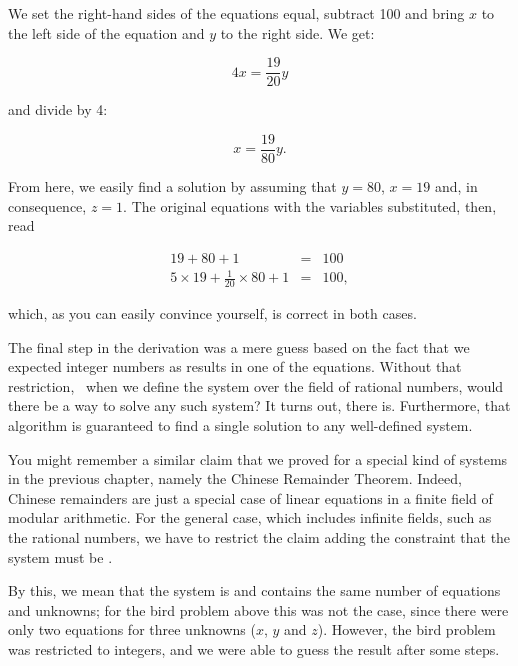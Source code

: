\documentclass[tikz]{scrreprt}
\begin{document}
We set the right-hand sides of the equations equal, 
subtract 100
and bring $x$ to the left side of the equation
and $y$ to the right side. We get:

\begin{equation}
4x = \frac{19}{20}y
\end{equation}

and divide by 4:

\begin{equation}
x = \frac{19}{80}y.
\end{equation}

From here, we easily find a solution
by assuming that $y=80$, $x=19$ and, in consequence,
$z=1$. The original equations with the variables 
substituted, then, read 

\begin{equation}
\begin{array}{lcl}
19 + 80 + 1 & = & 100\\
5\times 19 + \frac{1}{20}\times 80 + 1 & = & 100,
\end{array}
\end{equation}

which, as you can easily convince yourself, is correct
in both cases.

The final step in the derivation was a mere guess
based on the fact that we expected integer numbers
as results in one of the equations. 
Without that restriction, \ie\ when
we define the system over the field of rational
numbers, would there be a way to solve any such
system? It turns out, there is. Furthermore,
that algorithm is guaranteed to find a single solution to
any well-defined system.

You might remember a similar claim that we proved
for a special kind of systems in the previous chapter,
namely the Chinese Remainder Theorem. Indeed,
Chinese remainders are just a special case of
linear equations in a finite field of modular arithmetic.
For the general case, which includes infinite fields,
such as the rational numbers, we have to restrict
the claim adding the constraint that the system
must be .

By this, we mean that the system
is  and contains the same number of 
 equations
and unknowns; for the bird problem above this was
not the case, since there were only two equations
for three unknowns ($x$, $y$ and $z$). 
However, the bird problem was restricted to integers,
and we were able to guess the result after some steps. 
\end{document}
